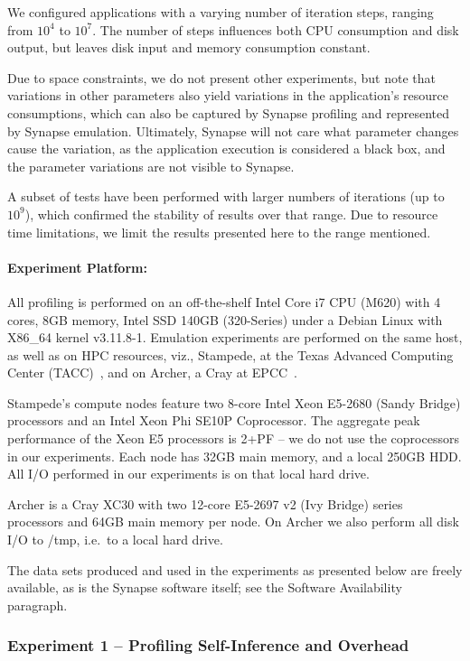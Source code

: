 \documentclass[10pt, conference, compsocconf]{IEEEtran}
\newcommand{\synapse}{Synapse\xspace}
\begin{document}
 We configured applications with a varying number of
 iteration steps, ranging from $10^4$ to $10^7$.  The number of steps influences
 both CPU consumption and disk output, but leaves disk input and memory
 consumption constant.
 
 Due to space constraints, we do not present other experiments, but note that
 variations in other parameters also yield variations in the application's
 resource consumptions, which can also be captured by \synapse profiling and
 represented by \synapse emulation.  Ultimately, \synapse will not care
 what parameter changes cause the variation, as the application execution is
 considered a black box, and the parameter variations are not visible to
 \synapse.

 A subset of tests have been performed with larger numbers of iterations (up to
 $10^9$), which confirmed the stability of results over that range.  Due to
 resource time limitations, we limit the results presented here to the range
 mentioned.

 \paragraph{Experiment Platform:} All profiling is performed on an off-the-shelf
 Intel Core i7 CPU (M620) with 4 cores, 8GB memory, Intel SSD 140GB (320-Series)
 under a Debian Linux with X86\_64 kernel v3.11.8-1.  Emulation experiments are
 performed on the same host, as well as on HPC resources, viz., Stampede, at the Texas Advanced Computing Center (TACC)~\cite{stampede_details},
 and on Archer, a Cray at EPCC~\cite{archer_details}.

 Stampede's compute nodes feature two 8-core Intel Xeon E5-2680 (Sandy
 Bridge) processors and an Intel Xeon Phi SE10P Coprocessor. The
 aggregate peak performance of the Xeon E5 processors is 2+PF -- we do
 not use the coprocessors in our experiments.  Each node has 32GB main
 memory, and a local 250GB HDD.  All I/O performed in our experiments
 is on that local hard drive.

 Archer is a Cray XC30 with two 12-core E5-2697 v2 (Ivy Bridge) series
 processors and 64GB main memory per node.  On Archer we also perform
 all disk I/O to /tmp, i.e.~to a local hard drive.

 The data sets produced and used in the experiments as presented below
 are freely available, as is the \synapse software itself; see the
 Software Availability paragraph.

 \setcounter{subsubsection}{0}
 \subsubsection*{Experiment 1 -- Profiling Self-Inference and Overhead}
\end{document}

